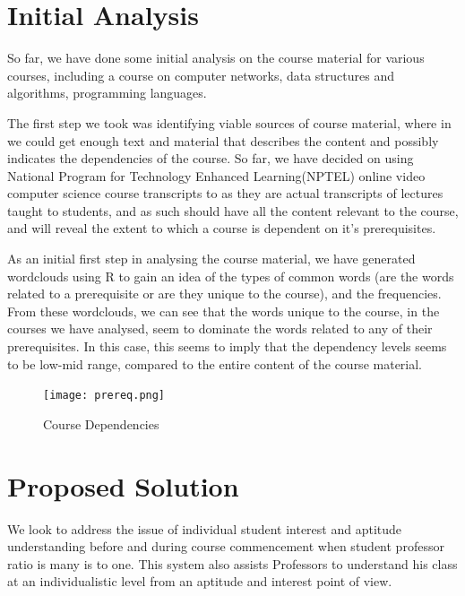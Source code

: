 \documentclass[conference]{IEEEtran}
\begin{document}
	\section{Initial Analysis}
So far, we have done some initial analysis on the course material for various courses, including a course on computer networks, data structures and algorithms, programming languages.

The first step we took was identifying viable sources of course material, where in we could get enough text and material that describes the content and possibly indicates the dependencies of the course. So far, we have decided on using National Program for Technology Enhanced Learning(NPTEL)\cite{nptel} online video computer science course transcripts to as they are actual transcripts of lectures taught to students, and as such should have all the content relevant to the course, and will reveal the extent to which a course is dependent on it's prerequisites.

As an initial first step in analysing the course material, we have generated wordclouds using R\cite{r} to gain an idea of the types of common words (are the words related to a prerequisite or are they unique to the course), and the frequencies. From these wordclouds, we can see that the words unique to the course, in the courses we have analysed, seem to dominate the words related to any of their prerequisites. In this case, this seems to imply that the dependency levels seems to be low-mid range, compared to the entire content of the course material.

\begin{figure}
	\texttt{[image: prereq.png]}
	\caption{Course Dependencies}
	\label{fig:prereq}
\end{figure}	
	\section{Proposed Solution}
We look to address the issue of individual student interest and aptitude understanding before and during course commencement when student professor ratio is many is to one. This system also assists Professors to understand his class at an individualistic level from an aptitude and interest point of view. 
\end{document}
